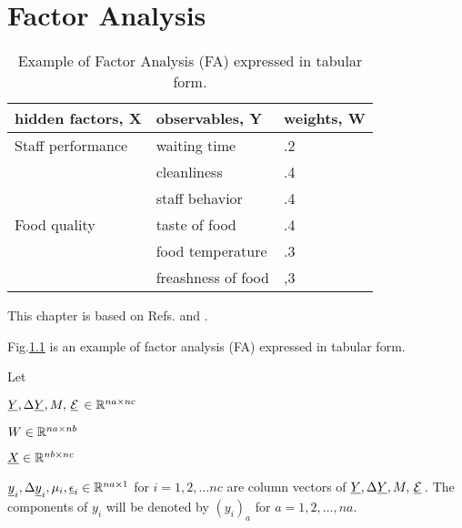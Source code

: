 \chapter{Factor Analysis}
\label{ch-factor-ana}


\begin{table}[h!]
\begin{tabular}{|l|l|l|}
\hline
hidden factors, X                          & observables, Y                                & weights, W \\ \hline
\cellcolor[HTML]{F4B9FB}Staff performance   & \cellcolor[HTML]{F4B9FB}waiting time       & .2         \\ \cline{2-3} 
\cellcolor[HTML]{F4B9FB}             & \cellcolor[HTML]{F4B9FB}cleanliness        & .4         \\ \cline{2-3} 
\cellcolor[HTML]{F4B9FB}             & \cellcolor[HTML]{F4B9FB}staff behavior     & .4         \\ \hline
\cellcolor[HTML]{B8FFDA}Food quality & \cellcolor[HTML]{B8FFDA}taste of food      & .4         \\ \cline{2-3} 
\cellcolor[HTML]{B8FFDA}             & \cellcolor[HTML]{B8FFDA}food temperature   & .3         \\ \cline{2-3} 
\cellcolor[HTML]{B8FFDA}             & \cellcolor[HTML]{B8FFDA}freashness of food & ,3         \\ \hline
\end{tabular}
\caption{Example of Factor Analysis (FA) expressed in tabular form.}
\label{tab-factor-ana}
\end{table}



This chapter is based on Refs.\cite{wiki-factor-ana} and
\cite{tipping-bishop}.

Fig.\ref{tab-factor-ana} is an example
of factor analysis (FA)
expressed in tabular form.

Let

$\rvY, \Delta\rvY, M, \rv{\cale}\in \RR^{na\times nc}$

$W\in { \mathbb{R}}^{na\times nb}$

$\rvX \in  \RR^{nb\times nc}$

$\rvy_i, \Delta\rvy_i, \mu_i, \rveps_i\in \RR^{na\times 1}$ for $i=1, 2, \ldots nc$ are column vectors of $\rvY, \Delta \rvY, M, \rv{\cale}$.
The components of $y_i$ will be denoted by $(y_i)_a$ for $a=1,2, \ldots, na$.

